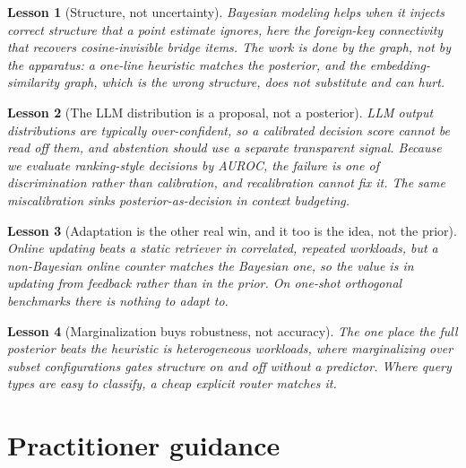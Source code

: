 \documentclass[11pt]{article}
\newtheorem{lesson}{Lesson}
\begin{document}
\begin{lesson}[Structure, not uncertainty]
Bayesian modeling helps when it injects correct structure that a point estimate ignores, here the
foreign-key connectivity that recovers cosine-invisible bridge items. The work is done by the graph,
not by the apparatus: a one-line heuristic matches the posterior, and the embedding-similarity graph,
which is the wrong structure, does not substitute and can hurt.
\end{lesson}

\begin{lesson}[The LLM distribution is a proposal, not a posterior]
LLM output distributions are typically over-confident, so a calibrated decision score cannot be read off
them, and abstention should use a separate transparent signal. Because we evaluate ranking-style
decisions by AUROC, the failure is one of discrimination rather than calibration, and recalibration
cannot fix it. The same miscalibration sinks posterior-as-decision in context budgeting.
\end{lesson}

\begin{lesson}[Adaptation is the other real win, and it too is the idea, not the prior]
Online updating beats a static retriever in correlated, repeated workloads, but a non-Bayesian online
counter matches the Bayesian one, so the value is in updating from feedback rather than in the prior. On
one-shot orthogonal benchmarks there is nothing to adapt to.
\end{lesson}

\begin{lesson}[Marginalization buys robustness, not accuracy]
The one place the full posterior beats the heuristic is heterogeneous workloads, where marginalizing
over subset configurations gates structure on and off without a predictor. Where query types are easy to
classify, a cheap explicit router matches it.
\end{lesson}

\section{Practitioner guidance}\label{sec:guidance}
\end{document}
